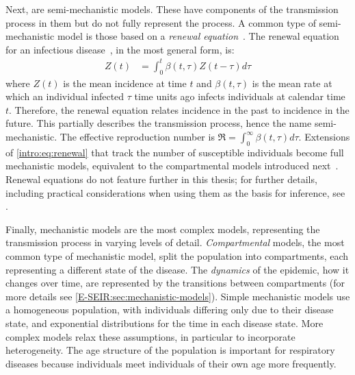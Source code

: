 \documentclass[thesis.tex]{subfiles}
\begin{document}
Next, are semi-mechanistic models.
These have components of the transmission process in them but do not fully represent the process.
A common type of semi-mechanistic model is those based on a \emph{renewal equation}~\autocite{bhattSemimechanistic}.
The renewal equation for an infectious disease~\autocite{fraserRenewal}, in the most general form, is:
\begin{align}
    Z(t) &= \int_{0}^{t} \beta(t,\tau) Z(t-\tau) d \tau
    \label{intro:eq:renewal}
\end{align}
where $Z(t)$ is the mean incidence at time $t$ and $\beta(t, \tau)$ is the mean rate at which an individual infected $\tau$ time units ago infects individuals at calendar time $t$.
Therefore, the renewal equation relates incidence in the past to incidence in the future.
This partially describes the transmission process, hence the name semi-mechanistic.
The effective reproduction number is $\Re = \int_0^\infty \beta(t, \tau) d\tau$.
Extensions of \cref{intro:eq:renewal} that track the number of susceptible individuals become full mechanistic models, equivalent to the compartmental models introduced next~\autocite{champredonEquivalence}.
Renewal equations do not feature further in this thesis; for further details, including practical considerations when using them as the basis for inference, see \textcite{nashEstimating,gosticPractical}.

Finally, mechanistic models are the most complex models, representing the transmission process in varying levels of detail.
\emph{Compartmental} models, the most common type of mechanistic model, split the population into compartments, each representing a different state of the disease.
The \emph{dynamics} of the epidemic, how it changes over time, are represented by the transitions between compartments (for more details see \cref{E-SEIR:sec:mechanistic-models}).
Simple mechanistic models use a homogeneous population, with individuals differing only due to their disease state, and exponential distributions for the time in each disease state.
More complex models relax these assumptions, in particular to incorporate heterogeneity.
The age structure of the population is important for respiratory diseases because individuals meet individuals of their own age more frequently.
\end{document}
